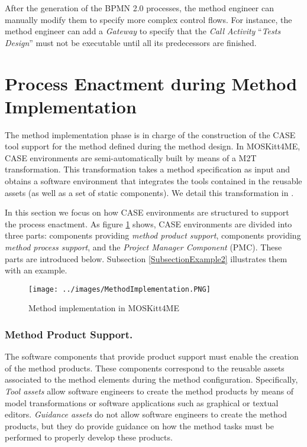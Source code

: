 \documentclass[runningheads,a4paper]{llncs}
\begin{document}
After the generation of the BPMN 2.0 processes, the method engineer can
manually modify them to specify more complex control flows. For instance, the
method engineer can add a \textit{Gateway} to specify that the \textit{Call
Activity} ``\textit{Tests Design}'' must not be executable until all its
predecessors are finished.

\section{Process Enactment during Method Implementation}
\label{SectionMethodImplementation}

The method implementation phase is in charge of the construction of the CASE
tool support for the method defined during the method design. In MOSKitt4ME,
CASE environments are semi-automatically built by means of a M2T transformation.
This transformation takes a method specification as input and obtains a software
environment that integrates the tools contained in the reusable assets (as well
as a set of static components). We detail this transformation in \cite{Cervera10b}.

In this section we focus on how CASE environments are structured to support
the process enactment. As figure \ref{FigureMethodImplementation} shows, CASE
environments are divided into three parts: components providing
\textit{method product support}, components providing \textit{method process
support}, and the \textit{Project Manager Component} (PMC). These parts are
introduced below. Subsection \ref{SubsectionExample2} illustrates them with an
example.

\begin{figure}
\centering
\texttt{[image: ../images/MethodImplementation.PNG]}
\caption{Method implementation in MOSKitt4ME}
\label{FigureMethodImplementation}
\end{figure}

\subsubsection{Method Product Support.}

The software components that provide product support must enable the
creation of the method products. These components
correspond to the reusable assets associated to the method elements during the
method configuration. Specifically, \textit{Tool assets} allow software
engineers to create the method products by means of model transformations or
software applications such as graphical or textual editors. \textit{Guidance
assets} do not allow software engineers to create the method
products, but they do provide guidance on how the method tasks must be
performed to properly develop these products.
\end{document}
